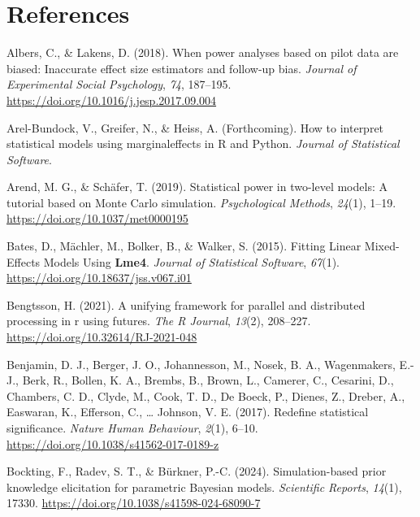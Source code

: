 \documentclass[
  man,
  floatsintext,
  longtable,
  a4paper,
  nolmodern,
  notxfonts,
  notimes,
  colorlinks=true,linkcolor=blue,citecolor=blue,urlcolor=blue]{apa7}
\newlength{\cslhangindent}
\newenvironment{CSLReferences}[2] %
 {\begin{list}{}{%
  \setlength{\itemindent}{0pt}
  \setlength{\leftmargin}{0pt}
  \setlength{\parsep}{0pt}
  \ifodd #1
   \setlength{\leftmargin}{\cslhangindent}
   \setlength{\itemindent}{-1\cslhangindent}
  \fi
  \setlength{\itemsep}{#2\baselineskip}}}
 {\end{list}}
\begin{document}
\section{References}\label{references}

\label{refs}
\begin{CSLReferences}{1}{0}
Albers, C., \& Lakens, D. (2018). When power analyses based on pilot
data are biased: {Inaccurate} effect size estimators and follow-up bias.
\emph{Journal of Experimental Social Psychology}, \emph{74}, 187--195.
\url{https://doi.org/10.1016/j.jesp.2017.09.004}

Arel-Bundock, V., Greifer, N., \& Heiss, A. (Forthcoming). How to
interpret statistical models using {marginaleffects} in {R} and
{Python}. \emph{Journal of Statistical Software}.

Arend, M. G., \& Schäfer, T. (2019). Statistical power in two-level
models: {A} tutorial based on {Monte Carlo} simulation.
\emph{Psychological Methods}, \emph{24}(1), 1--19.
\url{https://doi.org/10.1037/met0000195}

Bates, D., Mächler, M., Bolker, B., \& Walker, S. (2015). Fitting
{Linear Mixed-Effects Models Using} {\textbf{Lme4}}. \emph{Journal of
Statistical Software}, \emph{67}(1).
\url{https://doi.org/10.18637/jss.v067.i01}

Bengtsson, H. (2021). A unifying framework for parallel and distributed
processing in r using futures. \emph{The R Journal}, \emph{13}(2),
208--227. \url{https://doi.org/10.32614/RJ-2021-048}

Benjamin, D. J., Berger, J. O., Johannesson, M., Nosek, B. A.,
Wagenmakers, E.-J., Berk, R., Bollen, K. A., Brembs, B., Brown, L.,
Camerer, C., Cesarini, D., Chambers, C. D., Clyde, M., Cook, T. D., De
Boeck, P., Dienes, Z., Dreber, A., Easwaran, K., Efferson, C., \ldots{}
Johnson, V. E. (2017). Redefine statistical significance. \emph{Nature
Human Behaviour}, \emph{2}(1), 6--10.
\url{https://doi.org/10.1038/s41562-017-0189-z}

Bockting, F., Radev, S. T., \& Bürkner, P.-C. (2024). Simulation-based
prior knowledge elicitation for parametric {Bayesian} models.
\emph{Scientific Reports}, \emph{14}(1), 17330.
\url{https://doi.org/10.1038/s41598-024-68090-7}


\end{CSLReferences}
\end{document}
